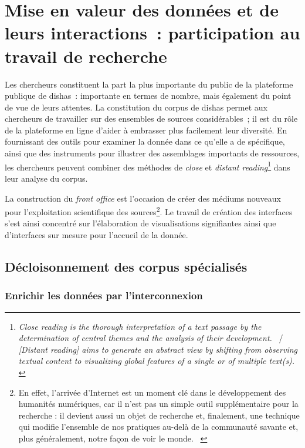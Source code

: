 \documentclass[a4paper,12pt,twoside]{book}
\newcommand{\clearemptydoublepage}{\newpage{\pagestyle{empty}\cleardoublepage}}
\newcommand{\eng}{\emph}
\newcommand{\fo}{\eng{front office}\xspace}
\newcommand{\g}[1]{\og#1~\fg}
\newcommand{\dishas}{\gls{dishas}\xspace}
\begin{document}
\clearemptydoublepage

\chapter[Participation au travail de recherche]{Mise en valeur des données et de leurs interactions~: participation au travail de recherche}
Les chercheurs constituent la part la plus importante du public de la plateforme publique de \dishas~: importante en termes de nombre, mais également du point de vue de leurs attentes. La constitution du corpus de \dishas permet aux chercheurs de travailler sur des ensembles de sources considérables~; il est du rôle de la plateforme en ligne d'aider à embrasser plus facilement leur diversité. En fournissant des outils pour examiner la donnée dans ce qu'elle a de spécifique, ainsi que des instruments pour illustrer des assemblages importants de ressources, les chercheurs peuvent combiner des méthodes de \eng{close} et \eng{distant reading}\footnote{\g{\eng{Close reading is the thorough interpretation of a text passage by the determination of central themes and the analysis of their development.}} / \g{\eng{[Distant reading] aims to generate an abstract view by shifting from observing textual content to visualizing global features of a single or of multiple text(s).}} \cite{janickeCloseDistantReading2015}} dans leur analyse du corpus.

La construction du \fo est l'occasion de créer des médiums nouveaux pour l'exploitation scientifique des sources\footnote{\g{En effet, l’arrivée d’Internet est un moment clé dans le développement des humanités numériques, car il n’est pas un simple outil supplémentaire pour la recherche : il devient aussi un objet de recherche et, finalement, une technique qui modifie l’ensemble de nos pratiques au-delà de la communauté savante et, plus généralement, notre façon de voir le monde.} \cite[§~11]{sinatraChapitreHistoireHumanites2014}}. Le travail de création des interfaces s'est ainsi concentré sur l'élaboration de visualisations signifiantes ainsi que d'interfaces sur mesure pour l'accueil de la donnée.

	\section{Décloisonnement des corpus spécialisés}
		\subsection{Enrichir les données par l'interconnexion}
\end{document}
